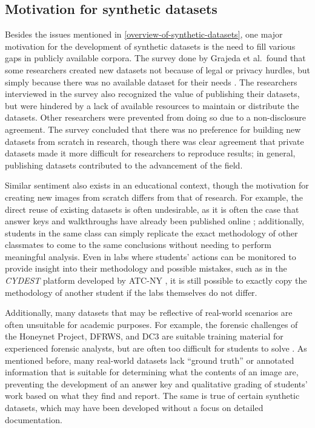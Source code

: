 \documentclass[letterpaper,12pt]{report}
\begin{document}
\subsection{Motivation for synthetic
datasets}\label{motivation-for-synthetic-datasets}

Besides the issues mentioned in \autoref{overview-of-synthetic-datasets}, one major motivation for the development of synthetic
datasets is the need to fill various gaps in publicly available corpora.
The survey done by Grajeda et al.~found that some researchers created
new datasets not because of legal or privacy hurdles, but simply because
there was no available dataset for their needs
\cite{grajedaAvailabilityDatasetsDigital2017}. The researchers
interviewed in the survey also recognized the value of publishing their
datasets, but were hindered by a lack of available resources to maintain
or distribute the datasets. Other researchers were prevented from doing
so due to a non-disclosure agreement. The survey concluded that there
was no preference for building new datasets from scratch in research,
though there was clear agreement that private datasets made it more
difficult for researchers to reproduce results; in general, publishing
datasets contributed to the advancement of the field.

Similar sentiment also exists in an educational context, though the
motivation for creating new images from scratch differs from that of
research. For example, the direct reuse of existing datasets is often
undesirable, as it is often the case that answer keys and walkthroughs
have already been published online
\cite{woodsCreatingRealisticCorpora2011}; additionally, students in
the same class can simply replicate the exact methodology of other
classmates to come to the same conclusions without needing to perform
meaningful analysis. Even in labs where students' actions can be
monitored to provide insight into their methodology and possible
mistakes, such as in the \emph{CYDEST} platform developed by ATC-NY
\cite{bruecknerAutomatedComputerForensics2008}, it is still possible
to exactly copy the methodology of another student if the labs
themselves do not differ.

Additionally, many datasets that may be reflective of real-world
scenarios are often unsuitable for academic purposes. For example, the
forensic challenges of the Honeynet Project, DFRWS, and DC3 are suitable
training material for experienced forensic analysts, but are often too
difficult for students to solve
\cite{woodsCreatingRealisticCorpora2011}. As mentioned before, many
real-world datasets lack ``ground truth'' or annotated information that
is suitable for determining what the contents of an image are,
preventing the development of an answer key and qualitative grading of
students' work based on what they find and report. The same is true of
certain synthetic datasets, which may have been developed without a
focus on detailed documentation.
\end{document}
